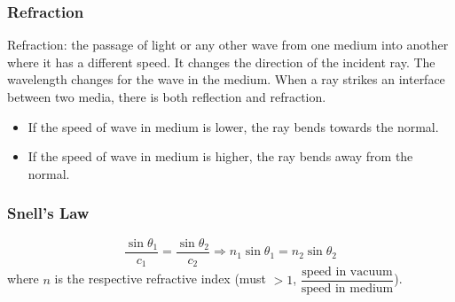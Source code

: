\documentclass[a4paper,12pt]{article}
\begin{document}
\begin{center}
\end{center}
\subsubsection*{Refraction}
Refraction: the passage of light or any other wave from one medium into another where it has a different speed.
It changes the direction of the incident ray. The wavelength changes for the wave in the medium.
When a ray strikes an interface between two media, there is both reflection and refraction. 
\begin{itemize}
  \item If the speed of wave in medium is lower, the ray bends towards the normal.
  \item If the speed of wave in medium is higher, the ray bends away from the normal.
\end{itemize}
\subsubsection*{Snell's Law}
\[\dfrac{\sin\theta_1}{c_1}=\dfrac{\sin\theta_2}{c_2}\Rightarrow n_1\sin\theta_1=n_2\sin\theta_2\]
where $n$ is the respective refractive index (must $>1$, $\dfrac{\text{speed in vacuum}}{\text{speed in medium}}$).
\end{document}
